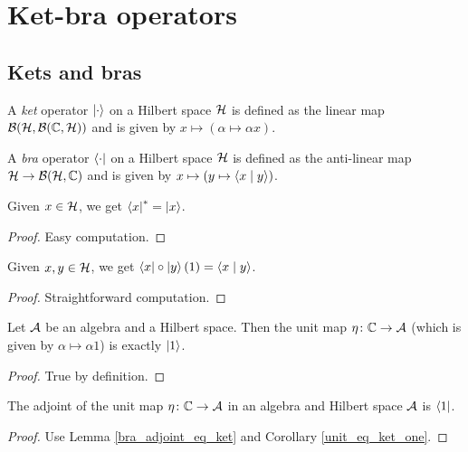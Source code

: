 \chapter{Ket-bra operators}

\section{Kets and bras}
\begin{definition}\label{ket}\leanok
  A \textit{ket} operator $\left\lvert\cdot\right\rangle$ on a Hilbert space $\mathcal{H}$ is defined as the linear map $\mathcal{B}(\mathcal{H},\mathcal{B}(\mathbb{C},\mathcal{H}))$ and is given by $x\mapsto(\alpha\mapsto\alpha x)$.
\end{definition}
\begin{definition}\label{bra}\leanok
  A \textit{bra} operator $\left\langle\cdot\right\rvert$ on a Hilbert space $\mathcal{H}$ is defined as the anti-linear map $\mathcal{H}\to\mathcal{B}(\mathcal{H},\mathbb{C})$ and is given by $x\mapsto(y\mapsto\left\langle x \mid y\right\rangle)$.
\end{definition}
\begin{lemma}\label{bra_adjoint_eq_ket}\leanok
  Given $x\in \mathcal{H}$, we get $\left\langle x\right\rvert^*=\left\lvert x\right\rangle$.
\end{lemma}
\begin{proof}\leanok
  Easy computation.
\end{proof}
\begin{corollary}\label{bra-ket}\leanok
  Given $x,y\in\mathcal{H}$, we get $\left\langle x\right\rvert\circ\left\lvert y\right\rangle(1)=\left\langle x \mid y\right\rangle$.
\end{corollary}
\begin{proof}\leanok
  Straightforward computation.
\end{proof}
\begin{corollary}\label{unit_eq_ket_one}
  \leanok
  Let $\mathcal{A}$ be an algebra and a Hilbert space. Then the unit map $\eta\colon\mathbb{C}\to\mathcal{A}$ (which is given by $\alpha\mapsto \alpha1$) is exactly $\left\lvert1\right\rangle$.
\end{corollary}
\begin{proof}\leanok
  True by definition.
\end{proof}
\begin{corollary}\label{unit_adjoint_eq_bra_one}\leanok
  The adjoint of the unit map $\eta\colon\mathbb{C}\to\mathcal{A}$ in an algebra and Hilbert space $\mathcal{A}$ is $\left\langle1\right\rvert$.
 \end{corollary}
 \begin{proof}\leanok
  Use Lemma \ref{bra_adjoint_eq_ket} and Corollary \ref{unit_eq_ket_one}.
 \end{proof}

